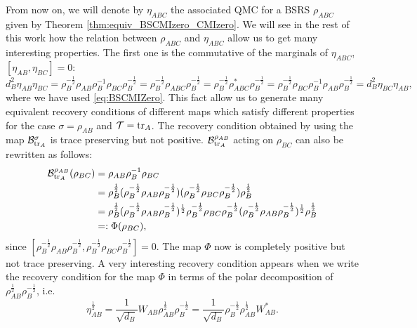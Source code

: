 \documentclass[11pt]{article}
\theoremstyle{newdefinition}
\theoremstyle{newplain}
\theoremstyle{myplain}
\DeclareMathOperator{\1}{\mathds{1}}
\newcommand{\PCR}[1]{{\color{blue}#1}}
\begin{document}
\PCR{
    From now on, we will denote by $\eta_{ABC}$ the associated QMC for a BSRS $\rho_{ABC}$ given by Theorem \ref{thm:equiv_BSCMIzero_CMIzero}. We will see in the rest of this work how the relation between $\rho_{ABC}$ and $\eta_{ABC}$ allow us to get many interesting properties. The first one is the commutative of the marginals of $\eta_{ABC}$, $[\eta_{AB},\eta_{BC}]=0$:
    \begin{equation}
        d_B^2 \eta_{AB}\eta_{BC}=\rho_B^{-\frac{1}{2}}\rho_{AB}\rho_B^{-1}\rho_{BC}\rho_B^{-\frac{1}{2}}=\rho_B^{-\frac{1}{2}}\rho_{ABC}\rho_B^{-\frac{1}{2}}=\rho_B^{-\frac{1}{2}}\rho_{ABC}^*\rho_B^{-\frac{1}{2}}=\rho_B^{-\frac{1}{2}}\rho_{BC}\rho_B^{-1}\rho_{AB}\rho_B^{-\frac{1}{2}}=d_B^2 \eta_{BC}\eta_{AB},
    \end{equation}
    where we have used \eqref{eq:BSCMIZero}. This fact allow us to generate many equivalent recovery conditions of different maps which satisfy different properties for the case $\sigma=\rho_{AB}$ and $\mathcal{T}=\tr_A$. The recovery condition obtained by using  the map $\mathcal{B}^\sigma_{\tr_A}$ is trace preserving but not positive.  $\mathcal{B}^{\rho_{AB}}_{\tr_A}$ acting on $\rho_{BC}$ can also be rewritten as follows:
    \begin{equation}
    \begin{split}
        \mathcal{B}^{\rho_{AB}}_{\tr_A}(\rho_{BC})&=\rho_{AB}\rho_B^{-1}\rho_{BC}\\
        &=\rho_{B}^{\frac{1}{2}}(\rho_B^{-\frac{1}{2}}\rho_{AB}\rho_B^{-\frac{1}{2}})(\rho_B^{-\frac{
1}{2}}\rho_{BC}\rho_B^{-\frac{1}{2}})\rho_B^{\frac{1}{2}}\\
&=\rho_B^{\frac{1}{2}}(\rho_B^{-\frac{1}{2}}\rho_{AB}\rho_B^{-\frac{1}{2}})^{\frac{1}{2}}\rho_B^{-\frac{
1}{2}}\rho_{BC}\rho_B^{-\frac{1}{2}}(\rho_B^{-\frac{1}{2}}\rho_{AB}\rho_B^{-\frac{1}{2}})^{\frac{1}{2}}\rho_B^{\frac{1}{2}}\\
&=:\Phi(\rho_{BC}),
    \end{split}
    \end{equation}
    since $[\rho_B^{-\frac{1}{2}}\rho_{AB}\rho_B^{-\frac{1}{2}},\rho_B^{-\frac{1}{2}}\rho_{BC}\rho_B^{-\frac{1}{2}}]=0$. The map $\Phi$ now is completely positive but not trace preserving. A very interesting recovery condition appears when we write the recovery condition for the map $\Phi$ in terms of the polar decomposition of $\rho_{AB}^{\frac{1}{2}}\rho_B^{-\frac{1}{2}}$, i.e. 
    \begin{equation}\label{eq:PolarDecompositionW}
        \eta_{AB}^{\frac{1}{2}}=\frac{1}{\sqrt{d_B}}W_{AB}\rho_{AB}^{\frac{1}{2}}\rho_{B}^{-\frac{1}{2}}=\frac{1}{\sqrt{d_B}}\rho_B^{-\frac{1}{2}}\rho_{AB}^{\frac{1}{2}}W_{AB}^*.

\end{equation}}
\end{document}
